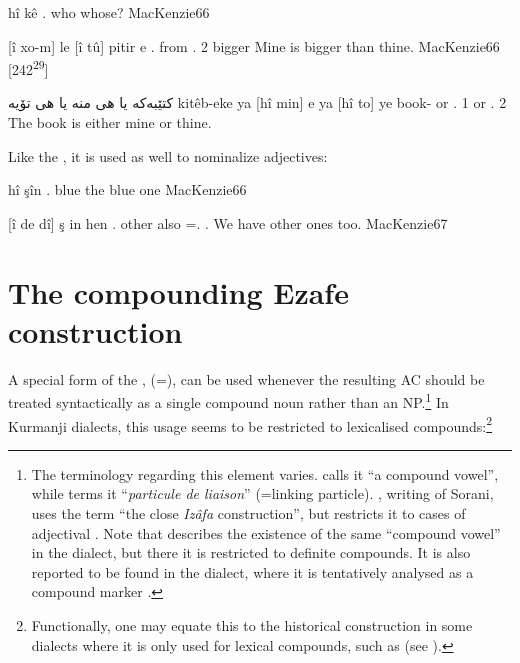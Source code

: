 {\zero{} hî kê}
{\zero{} \lnk.\ez{} who}
{whose?}
{MacKenzie}{66}

{\zero{} [î xo-m] le \zero{} [î tû] pitir \cb{}e}
{\zero{} \lnk.\ez{} \sg{} from \zero{} \lnk.\ez{} 2\sg{} bigger \cb{}\cop}
{Mine is bigger than thine.}
{MacKenzie}{66 {[242\textsuperscript{29}]}}

{كتێبەكە یا هی منە یا هی تۆیە}
{kitêb-eke ya \zero{} [hî min] \cb{}e ya \zero{} [hî to] \cb{}ye}
{book- or \zero{} \lnk.\ez{} 1\sg{} \cb{}\cop{} or \zero{} \lnk.\ez{} 2\sg{} \cb{}\cop}
{The book is either mine or thine.}
{\citep[64]{BlauSorani}}

Like the \Kur \lnk* \ez*, it is used as well to nominalize adjectives:

{\zero{} hî şîn}
{\zero{} \lnk.\ez{} blue}
{the blue one}
{MacKenzie}{66}

{\zero{} [î de dî] \cb{}ş \cb{}in hen}
{\zero{} \lnk.\ez{} \pl{} other \cb{}also =\pl.\agent{} \exist.\pl}
{We have other ones too.}
{MacKenzie}{67}
 

\section{The compounding Ezafe construction} \label{ss:Comp_Ez}

A special form of the \ez*,  (=\phonetic[æ]), can be used whenever the resulting AC should be treated syntactically as a single compound noun rather than an NP.\footnote{The terminology regarding this element varies. \citet[64, \S185]{MacKenzie} calls it \enquote{a compound vowel}, while \citet[58]{BlauSorani} terms it \enquote{\textit{particule de liaison}} (=linking particle). \citet[11]{ThackstonSorani}, writing of Sorani, uses the term \enquote{the close \textit{Izâfa} construction}, but restricts it to cases of adjectival \secns. Note that \citet[18]{MacKenzieHawrami} describes the existence of the same \enquote{compound vowel} in the  \Hawr dialect, but there it is restricted to definite compounds. It is also reported to be found in the  \Gawr dialect, where it is tentatively analysed as a compound marker \citep[16]{MahmoudveysiGawraju}.} In Kurmanji dialects, this usage seems to be restricted to lexicalised compounds:\footnote{Functionally, one may equate this to the historical \cst* construction in some  dialects where it is only used for lexical compounds, such as \Qar (see ).}

